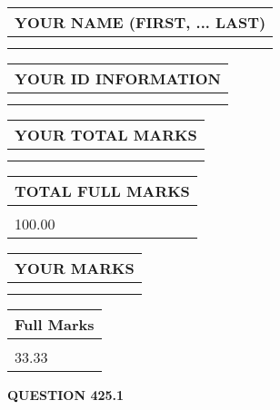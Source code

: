 \documentclass{ctexart}
\begin{document}
   
   
   
\newpage 
\setcounter{page}{ 
   425001 } 
   
   
   
   
\noindent\begin{tabular}{|l|}
\hline
YOUR NAME (FIRST, ... LAST)  \\
\hline
 \\ 
 \\ 
\hline
\end{tabular}
\hspace{0.05in} \begin{tabular}{|l|}
\hline
 YOUR   ID   INFORMATION  \\
\hline
 \\ 
 \\ 
\hline
\end{tabular}
   
   
\vspace{0.2in}\noindent\begin{tabular}{|l|}
\hline
YOUR TOTAL MARKS  \\
\hline
 \\ 
 \\ 
\hline
\end{tabular}
\hspace{0.05in} \begin{tabular}{|l|}
\hline
TOTAL FULL MARKS  \\
\hline
 \\ 
100.00 \\
\hline
\end{tabular}
   
   
 \vspace{0.2in}
 
 
 
 
   
   
  
\vspace{0.2in}
  
\noindent\begin{tabular}{|l|}
\hline
 YOUR MARKS  \\
\hline
 \\ 
 \\ 
\hline
\end{tabular}
\hspace{0.05in} \begin{tabular}{|l|}
\hline
 Full Marks  \\
\hline
 \\ 
33.33 \\
\hline
\end{tabular}
{\textbf{\Large{QUESTION
425.1 
}}}
  
\end{document}
